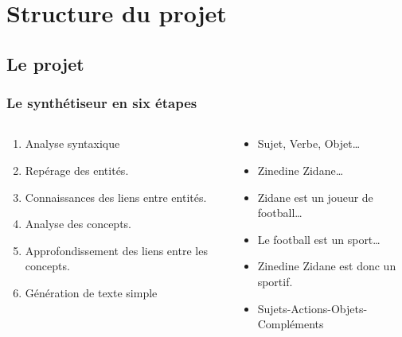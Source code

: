 \documentclass{beamer}
\begin{document}
\section{Structure du projet}

    \subsection{Le projet}

        \begin{frame}
        \frametitle{Le synthétiseur en six étapes}

            \begin{columns}[t]
                \begin{column}{6cm}
                    \begin{enumerate} %
                        \item Analyse syntaxique
                        \item Repérage des entités.
                        \item Connaissances des liens entre entités.
                        \item Analyse des concepts.
                        \item Approfondissement des liens entre les concepts.
                        \item Génération de texte simple
                    \end{enumerate}
                \end{column}

                \begin{column}{6cm}
                    \begin{itemize}
                        \item Sujet, Verbe, Objet\ldots{}
                        \item Zinedine Zidane\ldots{}
                        \item Zidane est un joueur de football\ldots{}
                        \item Le football est un sport\ldots{}
                        \item Zinedine Zidane est donc un sportif.
                        \item Sujets-Actions-Objets-Compléments
                    \end{itemize}
                \end{column}
            \end{columns}
        \end{frame}
\end{document}
